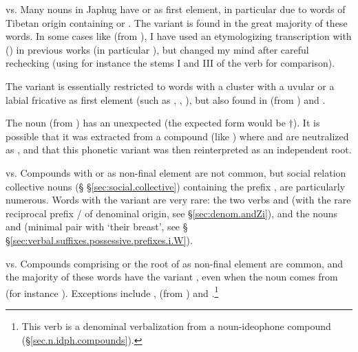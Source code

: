 \begin{paragraph}{ vs. }
Many nouns in Japhug have  or  as first element, in particular due to words of Tibetan origin containing  or . The variant   is found in the great majority of these words. In some cases like  (from ), I have used an etymologizing transcription with  () in previous works (in particular \citealt{jacques15japhug}), but changed my mind after careful rechecking (using for instance the stems I and III of the verb  for comparison). 
	
The variant  is essentially restricted to words with a cluster with a uvular or a labial fricative as first element (such as , , ), but also found in  (from ) and .
	
The noun  (from ) has an unexpected  (the expected form would be $\dagger$). It is possible that it was extracted from a compound (like ) where  and  are neutralized as , and that this phonetic variant was then reinterpreted as an independent root.
\end{paragraph}
\begin{paragraph}{ vs.  } \label{sec:compounds.ndZi.ndZW}
Compounds with  or  as non-final element are not common, but social relation collective nouns (§ §\ref{sec:social.collective}) containing the prefix , are particularly numerous. Words with the variant  are very rare: the two verbs  and  (with the rare reciprocal prefix / of denominal origin, see §\ref{sec:denom.andZi}), and the nouns  and  (minimal pair with  `their breast', see § §\ref{sec:verbal.suffixes.possessive.prefixes.i.W}).
\end{paragraph}
\begin{paragraph}{ vs.  }
	Compounds comprising  or the root of  as non-final element are common, and the majority of these words have the variant , even when the noun comes from  (for instance ). Exceptions include ,  (from ) and .\footnote{This verb is a denominal verbalization from a noun-ideophone compound (§\ref{sec.n.idph.compounds}).}
\end{paragraph}
